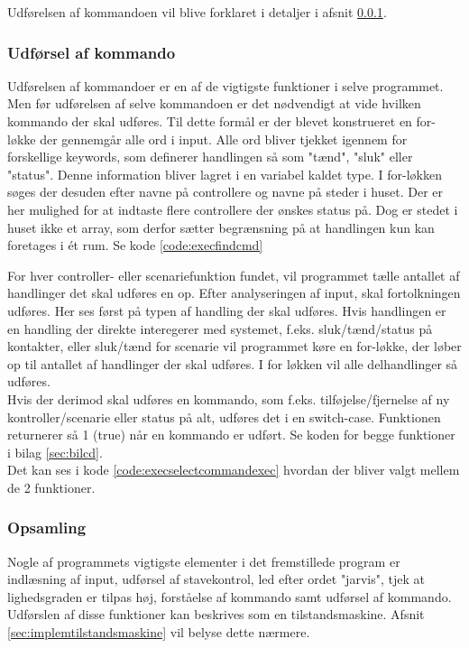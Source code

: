 Udførelsen af kommandoen vil blive forklaret i detaljer i afsnit \ref{sec:implemexeccmd}.


\subsubsection{Udførsel af kommando}\label{sec:implemexeccmd}
Udførelsen af kommandoer er en af de vigtigste funktioner i selve programmet. Men før udførelsen af selve kommandoen er det nødvendigt at vide hvilken kommando der skal udføres. Til dette formål er der blevet konstrueret en for-løkke der gennemgår alle ord i input. Alle ord bliver tjekket igennem for forskellige keywords, som definerer handlingen så som "tænd", "sluk" eller "status". Denne information bliver lagret i en variabel kaldet type. I for-løkken søges der desuden efter navne på controllere og navne på steder i huset. Der er her mulighed for at indtaste flere controllere der ønskes status på. Dog er stedet i huset ikke et array, som derfor sætter begrænsning på at handlingen kun kan foretages i ét rum. Se kode \ref{code:execfindcmd}


For hver controller- eller scenariefunktion fundet, vil programmet tælle antallet af handlinger det skal udføres en op. Efter analyseringen af input, skal fortolkningen udføres. Her ses først på typen af handling der skal udføres. Hvis handlingen er en handling der direkte interegerer med systemet, f.eks. sluk/tænd/status på kontakter, eller sluk/tænd for scenarie vil programmet køre en for-løkke, der løber op til antallet af handlinger der skal udføres. I for løkken vil alle delhandlinger så udføres.\\

Hvis der derimod skal udføres en kommando, som f.eks. tilføjelse/fjernelse af ny kontroller/scenarie eller status på alt, udføres det i en switch-case. Funktionen returnerer så 1 (true) når en kommando er udført. Se koden for begge funktioner i bilag \ref{sec:bilcd}.\\

Det kan ses i kode \ref{code:execselectcommandexec} hvordan der bliver valgt mellem de 2 funktioner.



\subsubsection*{Opsamling}
Nogle af programmets vigtigste elementer i det fremstillede program er indlæsning af input, udførsel af stavekontrol, led efter ordet "jarvis", tjek at lighedsgraden er tilpas høj, forståelse af kommando samt udførsel af kommando. Udførslen af disse funktioner kan beskrives som en tilstandsmaskine. Afsnit \ref{sec:implemtilstandsmaskine} vil belyse dette nærmere.

